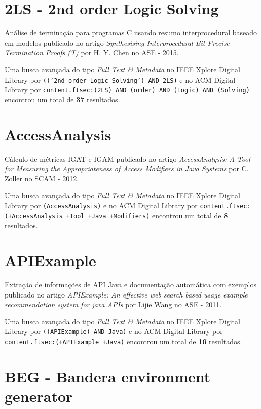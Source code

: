 

\label{softwares-summary}

\section{2LS - 2nd order Logic Solving}

Análise de terminação para programas C usando resumo interprocedural baseado em modelos
publicado no artigo
{\it Synthesising Interprocedural Bit-Precise Termination Proofs (T)}
por
H. Y. Chen
no
ASE
-
2015.


Uma busca avançada do tipo {\it Full Text \& Metadata} no IEEE Xplore Digital Library por
\texttt{(('2nd order Logic Solving') AND 2LS)}
e no ACM Digital Library por
\texttt{content.ftsec:(2LS) AND (order) AND (Logic) AND (Solving)}
encontrou um total de
{\bf 37}
resultados.

\section{AccessAnalysis}

Cálculo de métricas IGAT e IGAM
publicado no artigo
{\it AccessAnalysis: A Tool for Measuring the Appropriateness of Access Modifiers in Java Systems}
por
C. Zoller
no
SCAM
-
2012.


Uma busca avançada do tipo {\it Full Text \& Metadata} no IEEE Xplore Digital Library por
\texttt{(AccessAnalysis)}
e no ACM Digital Library por
\texttt{content.ftsec:(+AccessAnalysis +Tool +Java +Modifiers)}
encontrou um total de
{\bf 8}
resultados.

\section{APIExample}

Extração de informações de API Java e documentação automática com exemplos
publicado no artigo
{\it APIExample: An effective web search based usage example recommendation system for java APIs}
por
Lijie Wang
no
ASE
-
2011.


Uma busca avançada do tipo {\it Full Text \& Metadata} no IEEE Xplore Digital Library por
\texttt{((APIExample) AND Java)}
e no ACM Digital Library por
\texttt{content.ftsec:(+APIExample +Java)}
encontrou um total de
{\bf 16}
resultados.

\section{BEG - Bandera environment generator}

